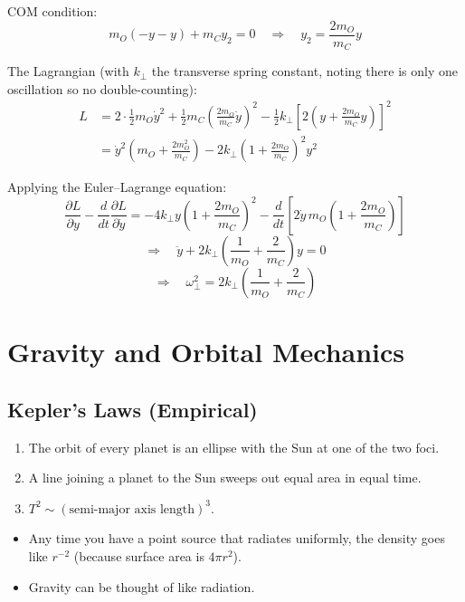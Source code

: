 COM condition:
\[
    m_O(-y - y) + m_C y_2 = 0 \quad\Rightarrow\quad y_2 = \frac{2m_O}{m_C}y
\]

The Lagrangian (with $k_\perp$ the transverse spring constant, noting there is only one oscillation so no double-counting):
\begin{align*}
    L &= 2 \cdot \tfrac{1}{2}m_O \dot{y}^2 + \tfrac{1}{2}m_C\left(\frac{2m_O}{m_C}\dot{y}\right)^2
    - \tfrac{1}{2}k_\perp\left[2\left(y + \frac{2m_O}{m_C}y\right)\right]^2 \\
    &= \dot{y}^2\left(m_O + \frac{2m_O^2}{m_C}\right) - 2k_\perp\left(1 + \frac{2m_O}{m_C}\right)^2 y^2
\end{align*}

Applying the Euler--Lagrange equation:
\[
    \frac{\partial L}{\partial y} - \frac{d}{dt}\frac{\partial L}{\partial \dot{y}}
    = -4k_\perp y\left(1 + \frac{2m_O}{m_C}\right)^2 - \frac{d}{dt}\left[2\dot{y}\,m_O\!\left(1 + \frac{2m_O}{m_C}\right)\right]
\]
\[
    \Rightarrow\quad \ddot{y} + 2k_\perp\left(\frac{1}{m_O} + \frac{2}{m_C}\right)y = 0
\]
\[
    \Rightarrow\quad \omega_\perp^2 = 2k_\perp\left(\frac{1}{m_O} + \frac{2}{m_C}\right)
\]


\chapter{Gravity and Orbital Mechanics}

\section{Kepler's Laws (Empirical)}

\begin{enumerate}
    \item The orbit of every planet is an ellipse with the Sun at one of the two foci.
    \item A line joining a planet to the Sun sweeps out equal area in equal time.
    \item $T^2 \sim (\text{semi-major axis length})^3$.
\end{enumerate}

\begin{itemize}
    \item Any time you have a point source that radiates uniformly, the density goes like $r^{-2}$ (because surface area is $4\pi r^2$).
    \item Gravity can be thought of like radiation.
\end{itemize}

